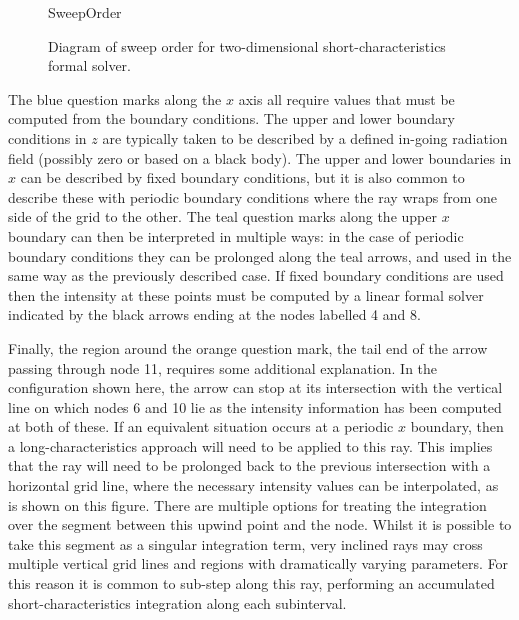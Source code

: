\begin{figure}
\centering
{SweepOrder}
\caption{Diagram of sweep order for two-dimensional short-characteristics formal solver.}
\label{Fig:2DSweep}
\end{figure}

The {\color{TolBlue} blue} question marks along the $x$ axis all require values that must be computed from the boundary conditions.
The upper and lower boundary conditions in $z$ are typically taken to be described by a defined in-going radiation field (possibly zero or based on a black body).
The upper and lower boundaries in $x$ can be described by fixed boundary conditions, but it is also common to describe these with periodic boundary conditions where the ray wraps from one side of the grid to the other.
The {\color{TolTeal} teal} question marks along the upper $x$ boundary can then be interpreted in multiple ways: in the case of periodic boundary conditions they can be prolonged along the {\color{TolTeal} teal} arrows, and used in the same way as the previously described case.
If fixed boundary conditions are used then the intensity at these points must be computed by a linear formal solver indicated by the black arrows ending at the nodes labelled 4 and 8.

Finally, the region around the {\color{TolOrange} orange} question mark, the tail end of the arrow passing through node 11, requires some additional explanation.
In the configuration shown here, the arrow can stop at its intersection with the vertical line on which nodes 6 and 10 lie as the intensity information has been computed at both of these.
If an equivalent situation occurs at a periodic $x$ boundary, then a long-characteristics approach will need to be applied to this ray.
This implies that the ray will need to be prolonged back to the previous intersection with a horizontal grid line, where the necessary intensity values can be interpolated, as is shown on this figure.
There are multiple options for treating the integration over the segment between this upwind point and the node.
Whilst it is possible to take this segment as a singular integration term, very inclined rays may cross multiple vertical grid lines and regions with dramatically varying parameters.
For this reason it is common to sub-step along this ray, performing an accumulated short-characteristics integration along each subinterval.

